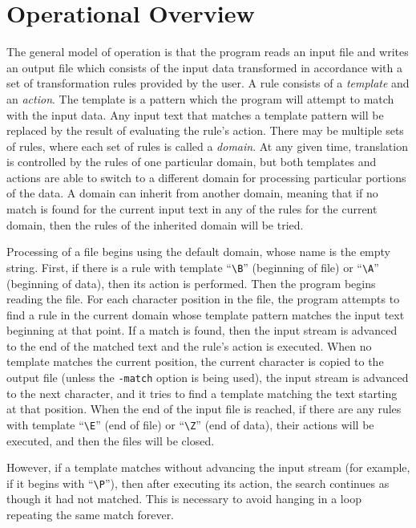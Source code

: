 

\section{Operational Overview}

The general model of operation is that the program reads an input file
and writes an output file which consists of the input data transformed in
accordance with a set of transformation rules provided by the user.
A rule consists of a {\em template} and an {\em action}.  The template
is a pattern which the program will attempt to match with the input data.
Any input text that matches a template pattern will be replaced by the
result of evaluating the rule's action.  There may be multiple sets of
rules, where each set of rules is called a {\em domain}.  At any given
time, translation is controlled by the rules of one particular domain, but
both templates and actions are able to switch to a different domain for
processing particular portions of the data.  A domain can inherit from
another domain, meaning that if no match is found for the current input
text in any of the rules for the current domain, then the rules of the
inherited domain will be tried.

Processing of a file begins using the default domain, whose name is the
empty string.  First, if there is a rule with template ``\verb/\B/''
(beginning of file) or ``\verb/\A/'' (beginning of data), then its action
is performed.  Then the program begins reading the file.  For each
character position in the file, the program attempts to find a rule in
the current domain whose template pattern matches the input text
beginning at that point.  If a match is found, then the input stream is
advanced to the end of the matched text and the rule's action is
executed.  When no template matches the current position, the current
character is copied to the output file (unless the \verb/-match/ option
is being used), the input stream is advanced to the next character, and
it tries to find a template matching the text starting at that position.
When the end of the input file is reached, if there are any rules with
template ``\verb/\E/'' (end of file) or ``\verb/\Z/'' (end of data),
their actions will be executed, and then the files will be closed.

However, if a template matches without advancing the input stream (for
example, if it begins with ``\verb/\P/''), then after executing its action,
the search continues as though it had not matched.  This is necessary to
avoid hanging in a loop repeating the same match forever.

